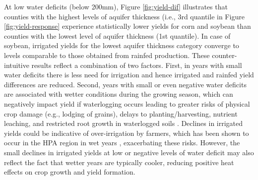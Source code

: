 \documentclass[
]{article}
\begin{document}
At low water deficits (below 200mm), Figure \ref{fig:yield-dif} illustrates that counties with the highest levels of aquifer thickness (i.e., 3rd quantile in Figure \ref{fig:yield-response} experience statistically lower yields for corn and soybean than counties with the lowest level of aquifer thickness (1st quantile). In case of soybean, irrigated yields for the lowest aquifer thickness category converge to levels comparable to those obtained from rainfed production. These counter-intuitive results reflect a combination of two factors. First, in years with small water deficits there is less need for irrigation and hence irrigated and rainfed yield differences are reduced. Second, years with small or even negative water deficits are associated with wetter conditions during the growing season, which can negatively impact yield if waterlogging occurs leading to greater risks of physical crop damage (e.g., lodging of grains), delays to planting/harvesting, nutrient leaching, and restricted root growth in waterlogged soils \citep{li2019excessive}. Declines in irrigated yields could be indicative of over-irrigation by farmers, which has been shown to occur in the HPA region in wet years \citep{foster2019assessing, gibson2017case, gibson2019benchmarking}, exacerbating these risks. However, the small declines in irrigated yields at low or negative levels of water deficit may also reflect the fact that wetter years are typically cooler, reducing positive heat effects on crop growth and yield formation.
\end{document}
